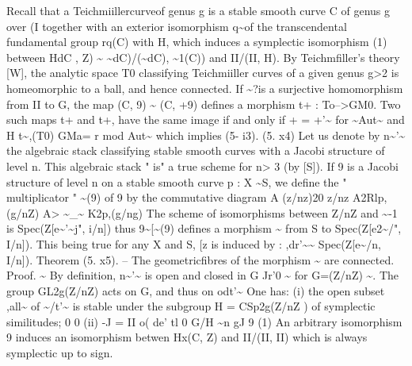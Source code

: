 \documentclass[11pt]{article}
\theoremstyle{plain}
\theoremstyle{definition}
\theoremstyle{remark}
\begin{document}
Recall that a Teichmiillercurveof genus g is a stable smooth curve C of genus g over (I together with an exterior isomorphism q\textasciitilde{}of the transcendental fundamental group rq(C) with H, which induces a symplectic isomorphism (1) between HdC , Z) \textasciitilde{} \textasciitilde{}dC)/(\textasciitilde{}dC), \textasciitilde{}1(C)) and II/(II, H). By Teichmfiller's theory [W], the analytic space T0 classifying Teichmiiller curves of a given genus g>2 is homeomorphic to a ball, and hence connected. If \textasciitilde{}?is a surjective homomorphism from II to G, the map (C, 9) \textasciitilde{} (C, +9) defines a morphism t+ : To-->GM0. Two such maps t+ and t+, have the same image if and only if + = +'\textasciitilde{} for \textasciitilde{}Aut\textasciitilde{} and H t\textasciitilde{},(T0) GMa= r mod Aut\textasciitilde{} which implies (5- i3). (5. x4) Let us denote by n\textasciitilde{}'\textasciitilde{} the algebraic stack classifying stable smooth curves with a Jacobi structure of level n. This algebraic stack " is" a true scheme for n> 3 (by [S]). If 9 is a Jacobi structure of level n on a stable smooth curve p : X \textasciitilde{}S, we define the " multiplicator " \textasciitilde{}(9) of 9 by the commutative diagram A (z/nz)20 z/nz A2Rlp,(g/nZ) A> \textasciitilde{}\_\textasciitilde{} K2p,(g/ng) The scheme of isomorphisms between Z/nZ and \textasciitilde{}-1 is Spec(Z[e\textasciitilde{}'\textasciitilde{}j", i/n]) thus 9\textasciitilde{}[\textasciitilde{}(9) defines a morphism \textasciitilde{} from S to Spec(Z[e2\textasciitilde{}/", I/n]). This being true for any X and S, [z is induced by : ,dr'\textasciitilde{}\textasciitilde{} Spec(Z[e\textasciitilde{}/n, I/n]). Theorem (5. x5). -- The geometricfibres of the morphism \textasciitilde{} are connected. Proof. \textasciitilde{} By definition, n\textasciitilde{}'\textasciitilde{} is open and closed in G Jr'0 \textasciitilde{} for G=(Z/nZ) \textasciitilde{}. The group GL2g(Z/nZ) acts on G, and thus on odt'\textasciitilde{} One has: (i) the open subset ,all\textasciitilde{} of \textasciitilde{}/t'\textasciitilde{} is stable under the subgroup H = CSp2g(Z/nZ ) of symplectic similitudes; 0 0 (ii) -J = II o( de' tl 0 G/H \textasciitilde{}n gJ 9 (1) An arbitrary isomorphism 9 induces an isomorphism betwen Hx(C, Z) and II/(II, II) which is always symplectic up to sign.
\end{document}
